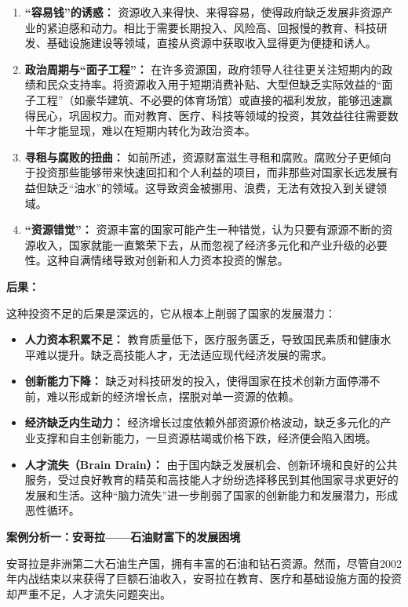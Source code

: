 \begin{enumerate}
    \item \textbf{“容易钱”的诱惑：} 资源收入来得快、来得容易，使得政府缺乏发展非资源产业的紧迫感和动力。相比于需要长期投入、风险高、回报慢的教育、科技研发、基础设施建设等领域，直接从资源中获取收入显得更为便捷和诱人。
    \item \textbf{政治周期与“面子工程”：} 在许多资源国，政府领导人往往更关注短期内的政绩和民众支持率。将资源收入用于短期消费补贴、大型但缺乏实际效益的“面子工程”（如豪华建筑、不必要的体育场馆）或直接的福利发放，能够迅速赢得民心，巩固权力。而对教育、医疗、科技等领域的投资，其效益往往需要数十年才能显现，难以在短期内转化为政治资本。
    \item \textbf{寻租与腐败的扭曲：} 如前所述，资源财富滋生寻租和腐败。腐败分子更倾向于投资那些能够带来快速回扣和个人利益的项目，而非那些对国家长远发展有益但缺乏“油水”的领域。这导致资金被挪用、浪费，无法有效投入到关键领域。
    \item \textbf{“资源错觉”：} 资源丰富的国家可能产生一种错觉，认为只要有源源不断的资源收入，国家就能一直繁荣下去，从而忽视了经济多元化和产业升级的必要性。这种自满情绪导致对创新和人力资本投资的懈怠。
\end{enumerate}

\textbf{后果：}

这种投资不足的后果是深远的，它从根本上削弱了国家的发展潜力：

\begin{itemize}
    \item \textbf{人力资本积累不足：} 教育质量低下，医疗服务匮乏，导致国民素质和健康水平难以提升。缺乏高技能人才，无法适应现代经济发展的需求。
    \item \textbf{创新能力下降：} 缺乏对科技研发的投入，使得国家在技术创新方面停滞不前，难以形成新的经济增长点，摆脱对单一资源的依赖。
    \item \textbf{经济缺乏内生动力：} 经济增长过度依赖外部资源价格波动，缺乏多元化的产业支撑和自主创新能力，一旦资源枯竭或价格下跌，经济便会陷入困境。
    \item \textbf{人才流失（Brain Drain）：} 由于国内缺乏发展机会、创新环境和良好的公共服务，受过良好教育的精英和高技能人才纷纷选择移民到其他国家寻求更好的发展和生活。这种“脑力流失”进一步削弱了国家的创新能力和发展潜力，形成恶性循环。
\end{itemize}

\textbf{案例分析一：安哥拉——石油财富下的发展困境}

安哥拉是非洲第二大石油生产国，拥有丰富的石油和钻石资源。然而，尽管自2002年内战结束以来获得了巨额石油收入，安哥拉在教育、医疗和基础设施方面的投资却严重不足，人才流失问题突出。

